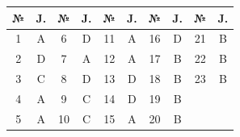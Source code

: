\begin{table}[!ht]
\centering
\begin{tabular}{|c|c|c|c|c|c|c|c|c|c|}
\hline
№ & J. & № & J. & № & J. & № & J. & № & J. \\ \hline
1 & A & 6 & D & 11 & A & 16 & D & 21 & B \\ \hline
2 & D & 7 & A & 12 & A & 17 & B & 22 & B \\ \hline
3 & C & 8 & D & 13 & D & 18 & B & 23 & B \\ \hline
4 & A & 9 & C & 14 & D & 19 & B & & \\ \hline
5 & A & 10 & C & 15 & A & 20 & B & & \\ \hline
\end{tabular}
\end{table}